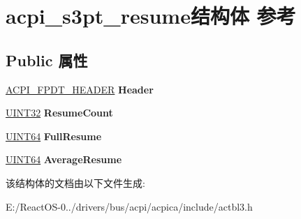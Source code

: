 \hypertarget{structacpi__s3pt__resume}{}\section{acpi\+\_\+s3pt\+\_\+resume结构体 参考}
\label{structacpi__s3pt__resume}
\subsection*{Public 属性}
\begin{DoxyCompactItemize}
\item 
\mbox{\label{structacpi__s3pt__resume_a9ac9f1144774040d25a425fd5dafd45f}} 
\hyperlink{structacpi__fpdt__header}{A\+C\+P\+I\+\_\+\+F\+P\+D\+T\+\_\+\+H\+E\+A\+D\+ER} {\bfseries Header}
\item 
\mbox{\label{structacpi__s3pt__resume_a35f4a9463fd7a400b496d485caefa304}} 
\hyperlink{_processor_bind_8h_ae1e6edbbc26d6fbc71a90190d0266018}{U\+I\+N\+T32} {\bfseries Resume\+Count}
\item 
\mbox{\label{structacpi__s3pt__resume_adb0f46fd1f1a468f0deab8a66dbb32ff}} 
\hyperlink{_processor_bind_8h_a57be03562867144161c1bfee95ca8f7c}{U\+I\+N\+T64} {\bfseries Full\+Resume}
\item 
\mbox{\label{structacpi__s3pt__resume_af1fa7aeff0e5013b92d9e1731a8ce329}} 
\hyperlink{_processor_bind_8h_a57be03562867144161c1bfee95ca8f7c}{U\+I\+N\+T64} {\bfseries Average\+Resume}
\end{DoxyCompactItemize}


该结构体的文档由以下文件生成\+:\begin{DoxyCompactItemize}
\item 
E\+:/\+React\+O\+S-\/0../drivers/bus/acpi/acpica/include/actbl3.\+h\end{DoxyCompactItemize}
